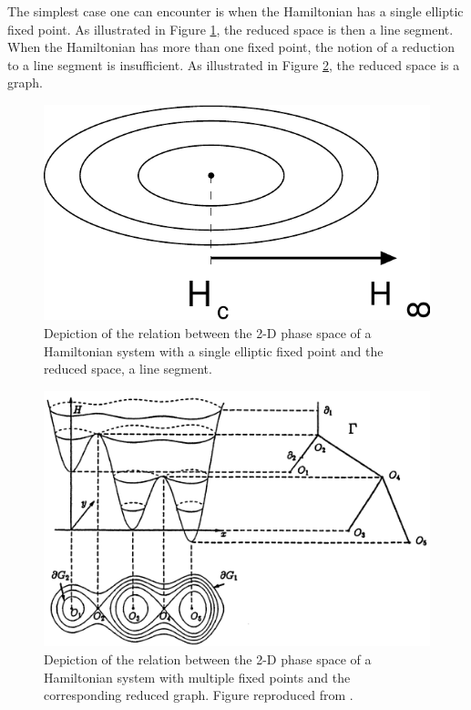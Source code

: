 The simplest case one can encounter is when the Hamiltonian has a single elliptic fixed point. As illustrated in Figure \ref{f:classical reduction}, the reduced space is then a line segment. When the Hamiltonian has more than one fixed point, the notion of a reduction to a line segment is insufficient. As illustrated in Figure \ref{f:graph reduction}, the reduced space is a graph.

\begin{figure}
\begin{center}
\includegraphics[width=\textwidth*7/8]{figures/classical_sa}
\caption{Depiction of the relation between the 2-D phase space of a Hamiltonian system with a single elliptic fixed point and the reduced space, a line segment.}
\label{f:classical reduction}
\end{center}
\end{figure}

\begin{figure}
\begin{center}
\includegraphics[width=\textwidth*7/8]{figures/graph_reduction_freidlin_weber}
\caption{Depiction of the relation between the 2-D phase space of a Hamiltonian system with multiple fixed points and the corresponding reduced graph. Figure reproduced from \citet{freidlin98:_random_pertur_nonlin_oscil}.}
\label{f:graph reduction}
\end{center}
\end{figure}

